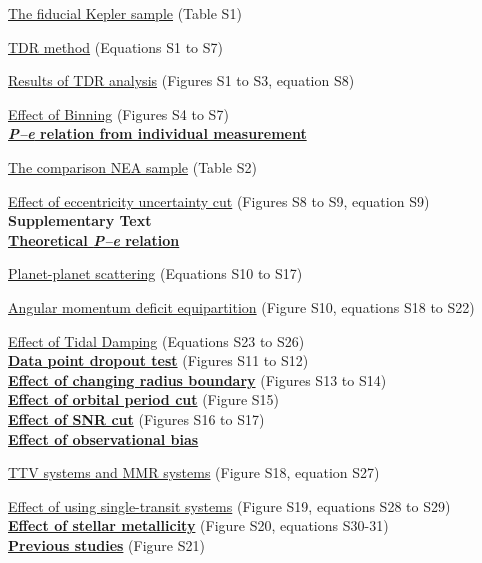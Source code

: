 \documentclass[10pt]{article}
\begin{document}
\hyperlink{s1.1}{The fiducial Kepler sample} (Table S1)

\hyperlink{s1.2}{TDR method} (Equations S1 to S7)

\hyperlink{s1.3}{Results of TDR analysis} (Figures S1 to S3, equation S8)

\hyperlink{s1.4}{Effect of Binning} (Figures S4 to S7)\\
\hyperlink{s2}{\bf \emph{P--e} relation from individual measurement}

\hyperlink{s2.1}{The comparison NEA sample} (Table S2)

\hyperlink{s2.2}{Effect of eccentricity uncertainty cut} (Figures S8 to S9, equation S9)\\
{\noindent \bf \fontsize{13pt}{15pt} \selectfont Supplementary Text}\\
\hyperlink{s3}{\bf Theoretical \emph{P--e} relation}

\hyperlink{s3.1}{Planet-planet scattering} (Equations S10 to S17)

\hyperlink{s3.2}{Angular momentum deficit equipartition} (Figure S10, equations S18 to S22)

\hyperlink{s3.3}{Effect of Tidal Damping} (Equations S23 to S26)\\
\hyperlink{s4}{\bf Data point dropout test} (Figures S11 to S12)\\
\hyperlink{s5}{\bf Effect of changing radius boundary} (Figures S13 to S14)\\
\hyperlink{s6}{\bf Effect of orbital period cut} (Figure S15)\\
\hyperlink{s7}{\bf Effect of SNR cut} (Figures S16 to S17)\\
\hyperlink{s8}{\bf Effect of observational bias}

\hyperlink{s8.1}{TTV systems and MMR systems} (Figure S18, equation S27)

\hyperlink{s8.2}{Effect of using single-transit systems} (Figure S19, equations S28 to S29)\\
\hyperlink{s9}{\bf Effect of stellar metallicity} (Figure S20, equations S30-31)\\
\hyperlink{s10}{\bf Previous studies} (Figure S21)
\clearpage
\end{document}
